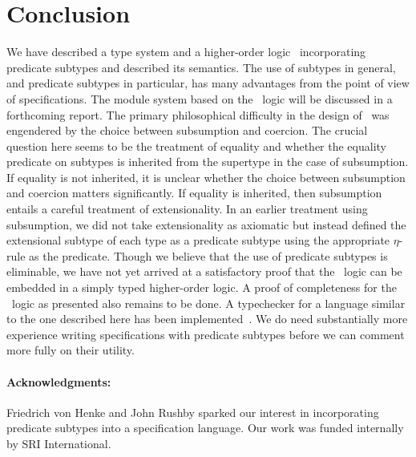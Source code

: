 \documentclass [12pt,twoside]{cslreport}
\begin{document}
{\section{Conclusion}
%
We have described a type system and a higher-order logic \ProL\ 
incorporating predicate subtypes and described its semantics.
The use of subtypes in general, and predicate subtypes in particular,
has many advantages from the point of view of specifications.  
The module system based on the \ProL\  logic will be discussed
in a forthcoming report.  
%
The primary philosophical difficulty in the design of \ProL\ 
was engendered by the choice between subsumption and coercion.
The crucial question here seems to be the treatment of equality and
whether the equality predicate on subtypes is inherited from the
supertype in the case of subsumption.  If equality is not inherited,
it is unclear whether the choice between subsumption and coercion
matters significantly.  If equality is inherited, then subsumption
entails a careful treatment of extensionality.  In an earlier
treatment using subsumption, we did not take extensionality
as axiomatic but instead defined the extensional subtype of each
type as a predicate subtype using the appropriate $\eta$-rule
as the predicate.  
%
Though we believe that the use of predicate subtypes is eliminable, we
have not yet arrived at a satisfactory proof that the \ProL\  logic
can be embedded in a simply typed higher-order logic.
A proof of completeness for the  \ProL\  logic as presented also
remains to be done.  A typechecker for a language similar to
the one described here has been implemented~\cite{EHDM:Tutorial}.  We do
need  substantially more experience writing specifications with
predicate subtypes before we can comment more fully on their utility.
%
\paragraph{Acknowledgments:}  Friedrich von Henke and John Rushby
sparked our interest in incorporating predicate subtypes into
a specification language.  Our work was funded internally by SRI
International.  
}

\newpage

\end{document}
